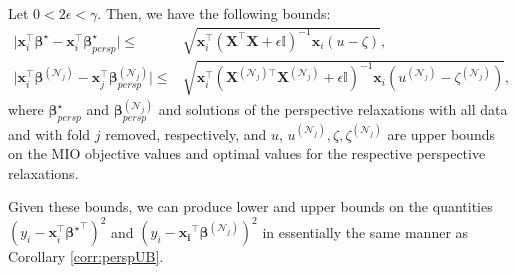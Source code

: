 \documentclass[mnsc,nonblindrev]{informs3} %
\newcommand{\ag}[1]{{\color{black}#1}}
\begin{document}

\begin{corollary}\label{corr:confidenceadjustment}
    Let $0 < 2\epsilon < \gamma$. Then, we have the following bounds:
    \begin{align}
       \vert \bm{x}_i^\top \bm{\beta}^\star - \bm{x}_i^\top \bm{\beta}_{persp}^\star\vert \leq & \sqrt{\bm{x}_i^\top \left(\bm{X}^\top \bm{X}+\epsilon\mathbb{I}\right)^{-1} \bm{x}_i(u-\zeta)},\\
        \vert \bm{x}_i^\top \bm{\beta}^{(\mathcal{N}_j)} -\bm{x}_j^\top \bm{\beta}_{persp}^{(\mathcal{N}_j)}\vert \leq & \sqrt{\bm{x}_i^\top \left(\bm{X}^{(\mathcal{N}_j)\top} \bm{X}^{(\mathcal{N}_j)}+\epsilon\mathbb{I}\right)^{-1} \bm{x}_i(u^{(\mathcal{N}_j)}-\zeta^{(\mathcal{N}_j)})},
    \end{align}
    \ag{where $\bm{\beta}_{persp}^{\star}$ and $\bm{\beta}_{persp}^{(\mathcal{N}_j)}$ and solutions of the perspective relaxations with all data and with fold $j$ removed, respectively, and $u$, $u^{(\mathcal{N}_j)},\zeta, \zeta^{(\mathcal{N}_j)}$ are upper bounds on the MIO objective values and optimal values for the respective perspective relaxations.}
\end{corollary}
Given these bounds, we can produce lower and upper bounds on the quantities $(y_i-\bm{x}_i^\top{\bm{\beta}^\star}^\top )^2$ and $(y_i-\bm{x_i}^\top\bm{\beta}^{(\mathcal{N}_j)})^2$ in essentially the same manner as Corollary \ref{corr:perspUB}. 
\end{document}
